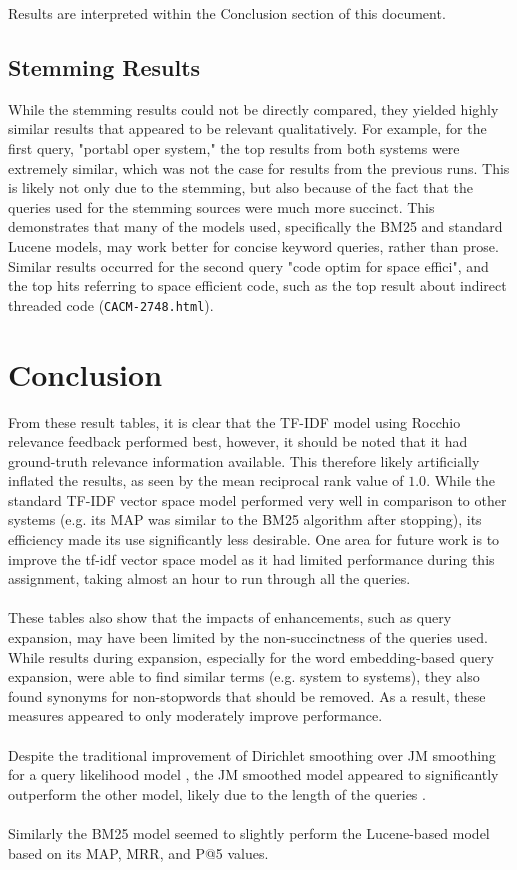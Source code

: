 \documentclass[conference]{IEEEtran}
\begin{document}
Results are interpreted within the Conclusion section of this document.

\subsection{Stemming Results}
While the stemming results could not be directly compared, they yielded highly similar results that appeared to be relevant qualitatively. For example, for the first query, "portabl oper system," the top results from both systems were extremely similar, which was not the case for results from the previous runs. This is likely not only due to the stemming, but also because of the fact that the queries used for the stemming sources were much more succinct. This demonstrates that many of the models used, specifically the BM25 and standard Lucene models, may work better for concise keyword queries, rather than prose. Similar results occurred for the second query "code optim for space effici", and the top hits referring to space efficient code, such as the top result about indirect threaded code (\verb|CACM-2748.html|).

\section{Conclusion}
From these result tables, it is clear that the TF-IDF model using Rocchio relevance feedback performed best, however, it should be noted that it had ground-truth relevance information available. This therefore likely artificially inflated the results, as seen by the mean reciprocal rank value of $1.0$. While the standard TF-IDF vector space model performed very well in comparison to other systems (e.g. its MAP was similar to the BM25 algorithm after stopping), its efficiency made its use significantly less desirable. One area for future work is to improve the tf-idf vector space model as it had limited performance during this assignment, taking almost an hour to run through all the queries.
\\\\
These tables also show that the impacts of enhancements, such as query expansion, may have been limited by the non-succinctness of the queries used. While results during expansion, especially for the word embedding-based query expansion, were able to find similar terms (e.g. system to systems), they also found synonyms for non-stopwords that should be removed. As a result, these measures appeared to only moderately improve performance.
\\\\
Despite the traditional improvement of Dirichlet smoothing over JM smoothing for a query likelihood model \cite{croftsearch}, the JM smoothed model appeared to significantly outperform the other model, likely due to the length of the queries \cite{croftsearch}.
\\\\
Similarly the BM25 model seemed to slightly perform the Lucene-based model based on its MAP, MRR, and P@5 values.
\end{document}
